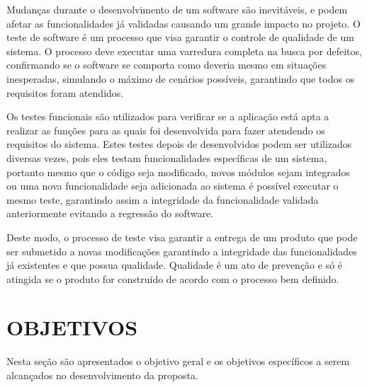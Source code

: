Mudanças durante o desenvolvimento de um software são inevitáveis, e podem afetar as funcionalidades já validadas causando um grande impacto no projeto. O teste de software é um processo que visa garantir o controle de qualidade de um sistema. O processo deve executar uma varredura completa na busca por defeitos, confirmando se o software se comporta como deveria mesmo em situações inesperadas, simulando o máximo de cenários possíveis, garantindo que todos os requisitos foram atendidos. 


Os testes funcionais são utilizados para verificar se a aplicação está apta a realizar as funções para as quais foi desenvolvida para fazer atendendo os requisitos do sistema. Estes testes depois de desenvolvidos podem ser utilizados diversas vezes, pois eles testam funcionalidades específicas de um sistema, portanto mesmo que o código seja modificado, novos módulos sejam integrados ou uma nova funcionalidade seja adicionada ao sistema é possível executar o mesmo teste, garantindo assim a integridade da funcionalidade validada anteriormente evitando a regressão do software.


Deste modo, o processo de teste visa garantir a entrega de um produto que pode ser submetido a novas modificações garantindo a integridade das funcionalidades já existentes e que possua qualidade. Qualidade é um ato de prevenção e só é atingida se o produto for construído de acordo com o processo bem definido. 






\section{OBJETIVOS}

Nesta seção são apresentados o objetivo geral e os objetivos específicos a
serem alcançados no desenvolvimento da proposta.

